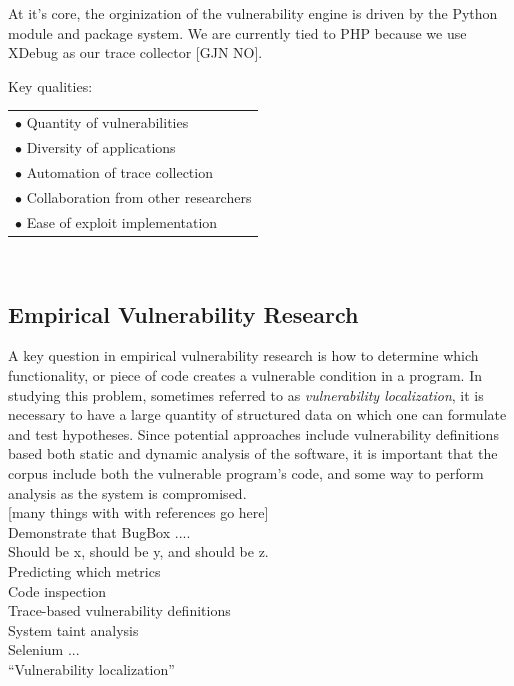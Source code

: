 \documentclass[letterpaper,twocolumn,10pt]{article}
\begin{document}
  
At it's core, the orginization of the vulnerability engine is driven by the Python module and package system.
We are currently tied to PHP because we use XDebug as our trace collector [GJN NO].  

Key qualities:\\
 \begin{tabular}{ l }
   $\bullet$ Quantity of vulnerabilities\\
   $\bullet$ Diversity of applications\\
   $\bullet$ Automation of trace collection\\
   $\bullet$ Collaboration from other researchers\\
   $\bullet$ Ease of exploit implementation\\

 \end{tabular}
\\


\subsection{Empirical Vulnerability Research}


A key question in empirical vulnerability research is how to determine which functionality, or piece of code creates a vulnerable condition in a program. In studying this problem, sometimes referred to as \emph{vulnerability localization}, it is necessary to have a large quantity of structured data on which one can formulate and test hypotheses. Since potential approaches include vulnerability definitions based both static and dynamic analysis of the software, it is important that the corpus include both the vulnerable program's code, and some way to perform analysis as the system is compromised.\\


[many things with with references go here]\\

Demonstrate that BugBox ....\\
Should be x, should be y, and should be z.\\
Predicting which metrics  \\

Code inspection\\
Trace-based vulnerability definitions\\
System taint analysis\\
Selenium ... \\


``Vulnerability localization''
\end{document}
